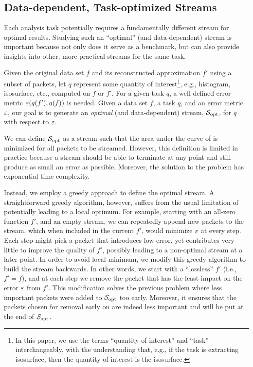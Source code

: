 \subsection{Data-dependent, Task-optimized Streams} \label{sec:data_dep_streams}


Each analysis task potentially requires a fundamentally different stream for
optimal results.  Studying such an ``optimal'' (and data-dependent) stream is
important because not only does it serve as a benchmark, but can also provide
insights into other, more practical streams for the same task.

Given the original data set $f$ and its reconstructed approximation $f'$ using a
subset of packets, let $q$ represent some quantity of interest\footnote{In this
paper, we use the terms ``quantity of interest'' and ``task'' interchangeably,
with the understanding that, e.g., if the task is extracting isosurface, then
the quantity of interest is the isosurface.}, e.g., histogram, isosurface, etc.,
computed on $f$ or $f'$. For a given task $q$, a well-defined error metric
$\err(q(f'),q(f))$ is needed. Given a data set $f$, a task $q$, and an error
metric $\err$, our goal is to generate an \emph{optimal} (and data-dependent)
stream, $\sopt$, for $q$ with respect to $\err$.

We can define $\sopt$ as a stream such that the area under the curve of \err
is minimized for all packets to be streamed. However, this definition is limited
in practice because a stream should be able to terminate at any point and 
still produce as small an error as possible. Moreover, the solution to the problem
has exponential time complexity.

Instead, we employ a greedy approach to define the optimal stream.  A
straightforward greedy algorithm, however, suffers from the usual limitation of
potentially leading to a local optimum. For example, starting with an all-zero
function $f'$, and an empty stream, we can repeatedly append new packets to the
stream, which when included in the current $f'$, would minimize $\err$ at every
step. Each step might pick a packet that introduces low error, yet
contributes very little to improve the quality of $f'$, possibly leading to
a non-optimal stream at a later point.  In order to avoid local minimum, we
modify this greedy algorithm to build the stream backwards. In other words, we
start with a ``lossless'' $f'$ (i.e., $f'=f$), and at each step we remove the
packet that has the least impact on the error $\err$ from $f'$.  This
modification solves the previous problem where less important packets were
added to $\sopt$ too early. Moreover, it ensures that the packets chosen for removal
early on are indeed less important and will be put at the end of $\sopt$.


